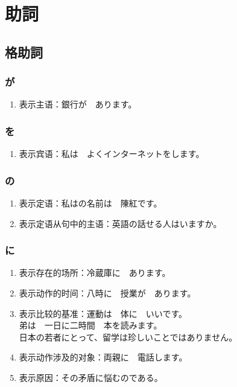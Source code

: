 \section{助詞}%


\subsection{格助詞}%

\subsubsection{が}%

\begin{enumerate}
  \item 表示主语：銀行が　あります。
\end{enumerate}


\subsubsection{を}%

\begin{enumerate}
  \item 表示宾语：私は　よくインターネットをします。
\end{enumerate}


\subsubsection{の}%

\begin{enumerate}
  \item 表示定语：私はの名前は　陳紅です。
  \item 表示定语从句中的主语：英語の話せる人はいますか。
\end{enumerate}


\subsubsection{に}%

\begin{enumerate}
  \item 表示存在的场所：冷蔵庫に　あります。
  \item 表示动作的时间：八時に　授業が　あります。
  \item 表示比较的基准：運動は　体に　いいです。\\ 
    弟は　一日に二時間　本を読みます。\\
    日本の若者にとって、留学は珍しいことではありません。
  \item 表示动作涉及的对象：両親に　電話します。
  \item 表示原因：その矛盾に悩むのである。
\end{enumerate}


